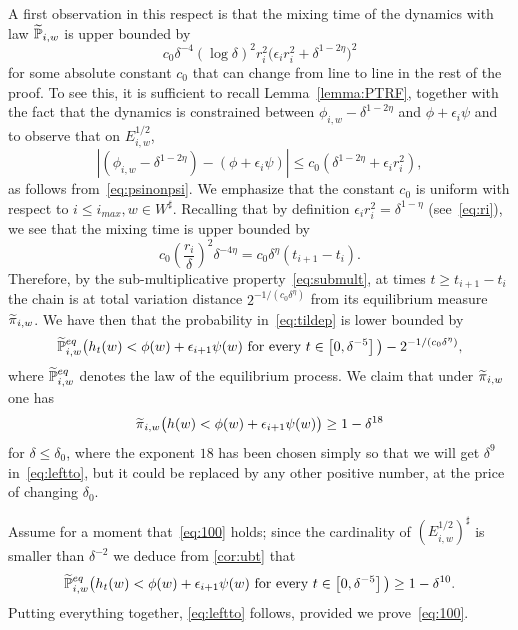\documentclass[AHL,Unicode,longabstracts,published]{cedram}
\renewcommand{\P}{\mathbb{P}}
\newcommand{\eps}{\epsilon}
\renewcommand{\d}{{\sharp }}
\let\oldtilde\tilde
\renewcommand*{\tilde}[1]{\mathchoice{\widetilde{#1}}{\widetilde{#1}}{\oldtilde{#1}}{\oldtilde{#1}}}
\begin{document}
A first observation in this respect is that the mixing time of the dynamics with law $\tilde\P_{i,w}$ is upper bounded by
\begin{equation}
c_0\delta^{-4}(\log \delta)^2r_i^2\Big(\epsilon_i r_i^2+\delta^{1-2\eta}\Big)^2
\end{equation}
for some absolute constant $c_0$ that can change from line to line in the rest of the proof. To see this, it is sufficient to recall Lemma~\ref{lemma:PTRF}, together with the fact that the dynamics is constrained between $\phi_{i,w}-\delta^{1-2\eta}$ and $ \phi+\epsilon_i\psi$ and to observe that on $E^{1/2}_{i,w}$,
\begin{equation}
\left|\left(\phi_{i,w}-\delta^{1-2\eta}\right)-(\phi+\epsilon_i\psi)\right|\le c_0\left(\delta^{1-2\eta}+\epsilon_i r_i^2\right),
\end{equation}
as follows from~\eqref{eq:psinonpsi}. We emphasize that the constant $c_0$ is uniform with respect to $i\le i_{max},w\in W^\d$. Recalling that by definition $\epsilon_i r_i^2=\delta^{1-\eta}$ (see~\eqref{eq:ri}), we see that the mixing time is upper bounded by
\begin{equation}
c_0\left(\frac{r_i}\delta\right)^2\delta^{-4\eta}=c_0\delta^{\eta}(t_{i+1}-t_i).
\end{equation}
Therefore, by the sub-multiplicative property~\eqref{eq:submult}, at times $t\ge t_{i+1}-t_i$ the chain is at total variation distance $2^{-1/(c_0\delta^{\eta})}$ from its equilibrium measure $\tilde \pi_{i,w}$. We have then that the probability in~\eqref{eq:tildep} is lower bounded by
\begin{equation}
\tilde \P^{eq}_{i,w}\big(h_t(w) < \phi(w) + \eps_{i+1} \psi(w) \text{ for every } t\in \left[0, \delta^{-5}\right]\big)-2^{-1/(c_0\delta^{\eta})},
\end{equation}
where $\tilde \P^{eq}_{i,w}$ denotes the law of the equilibrium process. We claim that under $\tilde\pi_{i,w}$ one has
\begin{equation}\label{eq:100}
\tilde\pi_{i,w}\big(h(w) < \phi(w) + \eps_{i+1} \psi(w)\big)\ge 1-\delta^{18}
\end{equation}
for $\delta\le \delta_0$, where the exponent $18$ has been chosen simply so that we will get $\delta^9$ in~\eqref{eq:leftto}, but it could be replaced by any other positive number, at the price of changing $\delta_0$.

Assume for a moment that~\eqref{eq:100} holds; since the cardinality of $(E^{1/2}_{i,w})^\d$ is smaller than $\delta^{-2}$ we deduce from \cref{cor:ubt} that
\begin{equation}
\tilde \P^{eq}_{i,w}\big(h_t(w) < \phi(w) + \eps_{i+1} \psi(w) \text{ for every } t\in \left[0, \delta^{-5}\right]\big)\ge 1-\delta^{10}.
\end{equation}
Putting everything together, \eqref{eq:leftto} follows, provided we prove~\eqref{eq:100}.
\end{document}
